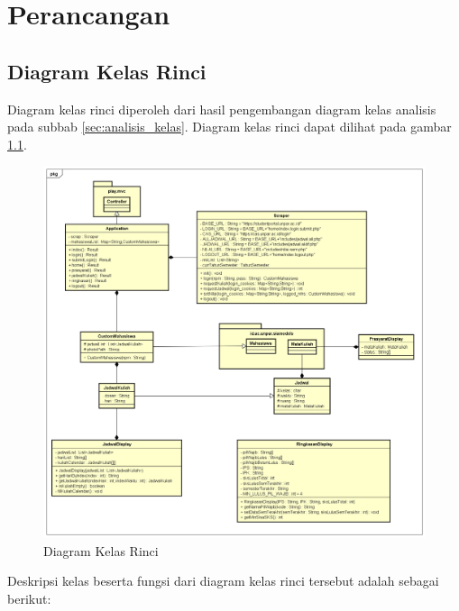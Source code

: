 \chapter{Perancangan}
\label{chap:perancangan}

\section{Diagram Kelas Rinci} 
\label{sec:diagram_kelas_rinci}
Diagram kelas rinci diperoleh dari hasil pengembangan diagram kelas analisis pada subbab \ref{sec:analisis_kelas}. Diagram kelas rinci dapat dilihat pada gambar \ref{fig:4_final_class_diagram}. 
	\begin{figure}[H]
			\centering
			\includegraphics[scale=0.5]{Gambar/class-diagram-final}
			\caption{Diagram Kelas Rinci} 
			\label{fig:4_final_class_diagram}
		\end{figure}
	Deskripsi kelas beserta fungsi dari diagram kelas rinci tersebut adalah sebagai berikut:
